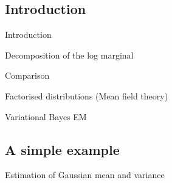 \subsection{Introduction}
\begin{frame}{Introduction}
\end{frame}
\begin{frame}{Decomposition of the log marginal}
\end{frame}
\begin{frame}{Comparison}
\end{frame}
\begin{frame}{Factorised distributions (Mean field theory)}
\end{frame}
\begin{frame}{Variational Bayes EM}
\end{frame}

\subsection{A simple example}
\begin{frame}{Estimation of Gaussian mean and variance}
\end{frame}